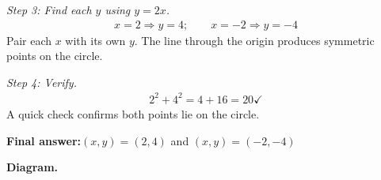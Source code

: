 \documentclass[11pt]{article}
\begin{document}
\textit{Step 3: Find each \( y \) using \( y = 2x \).}
\[\begin{gathered}
x = 2 \Rightarrow y = 4; \qquad x = -2 \Rightarrow y = -4
\end{gathered}\]
Pair each \( x \) with its own \( y \). The line through the origin produces symmetric points on the circle.

\textit{Step 4: Verify.}
\[\begin{gathered}
2^2 + 4^2 = 4 + 16 = 20 \checkmark
\end{gathered}\]
A quick check confirms both points lie on the circle.

\begin{answerbox}
\textbf{Final answer:}\quad \(\displaystyle (x, y) = (2, 4)\) and \(\displaystyle (x, y) = (-2, -4)\)
\end{answerbox}
\textbf{Diagram.}
\end{document}
